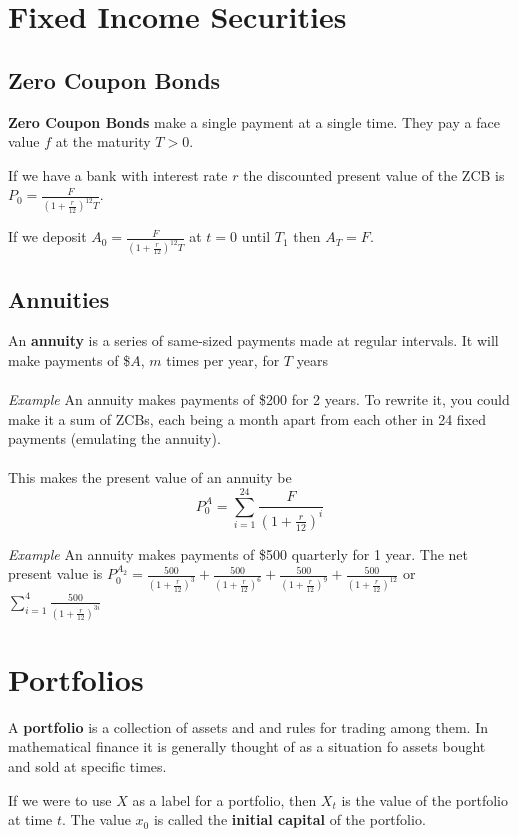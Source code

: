 \documentclass[12pt,letterpaper, twocolumn]{article}
\begin{document}
\section{Fixed Income Securities}
\subsection{Zero Coupon Bonds}
\textbf{Zero Coupon Bonds} make a single payment at a single time. They pay a face value $f$ at the maturity $T>0$. 

If we have a bank with interest rate $r$ the discounted present value of the ZCB is $P_0 = \frac{F}{(1+\frac{r}{12})^12T}$. 

If we deposit $A_0 = \frac{F}{(1+\frac{r}{12})^12T}$ at $t=0$ until $T_1$ then $A_T = F$. 

\subsection{Annuities}
An \textbf{annuity} is a series of same-sized payments made at regular intervals. It will make payments of \$$A$, $m$ times per year, for $T$ years
\\\\
\textit{Example}
An annuity makes payments of \$200 for 2 years. To rewrite it, you could make it a sum of ZCBs, each being a month apart from each other in 24 fixed payments (emulating the annuity). 
\\\\
This makes the present value of an annuity be
 \[P_0^A = \sum_{i=1}^{24}\frac{F}{(1+\frac{r}{12})^i}\]


\textit{Example}
An annuity makes payments of \$500 quarterly for 1 year. The net present value is $P_0^{A_2}= \frac{500}{(1+\frac{r}{12})^3} + \frac{500}{(1+\frac{r}{12})^6} + \frac{500}{(1+\frac{r}{12})^9} + \frac{500}{(1+\frac{r}{12})^{12}}$ or $\sum_{i=1}^{4}\frac{500}{(1+\frac{r}{12})^{3i}}$

\section{Portfolios}
A \textbf{portfolio} is a collection of assets and and rules for trading among them. In mathematical finance it is generally thought of as a situation fo assets bought and sold at specific times. 

If we were to use $X$ as a label for a portfolio, then $X_t$ is the value of the portfolio at time $t$. The value $x_0$ is called the \textbf{initial capital} of the portfolio. 
\end{document}
